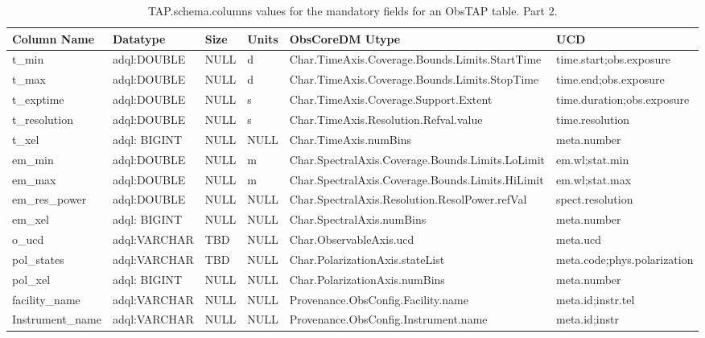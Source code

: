 \documentclass[11pt,a4paper]{ivoa}
\begin{document}
\begin{table}
\small
\begin{tabular}{|l|l|l|l|l|l|}%
\hline
Column Name & Datatype & Size & Units & ObsCoreDM Utype & UCD \\\hline
t\_min &
adql:DOUBLE &
NULL &
d &
Char.TimeAxis.Coverage.Bounds.Limits.StartTime &
time.start;obs.exposure \\\hline
t\_max &
adql:DOUBLE &
NULL &
d &
Char.TimeAxis.Coverage.Bounds.Limits.StopTime &
time.end;obs.exposure
\\\hline
t\_exptime &
adql:DOUBLE &
NULL &
s &
Char.TimeAxis.Coverage.Support.Extent &
time.duration;obs.exposure
\\\hline
t\_resolution &
adql:DOUBLE &
NULL &
s &
Char.TimeAxis.Resolution.Refval.value &
time.resolution
\\\hline
t\_xel &
adql: BIGINT &
NULL &
NULL &
Char.TimeAxis.numBins &
meta.number
\\\hline
em\_min &
adql:DOUBLE &
NULL &
m &
Char.SpectralAxis.Coverage.Bounds.Limits.LoLimit &
em.wl;stat.min
\\\hline
em\_max &
adql:DOUBLE &
NULL &
m &
Char.SpectralAxis.Coverage.Bounds.Limits.HiLimit &
em.wl;stat.max
\\\hline
em\_res\_power &
adql:DOUBLE &
NULL &
NULL &
Char.SpectralAxis.Resolution.ResolPower.refVal &
spect.resolution
\\\hline
em\_xel &
adql: BIGINT &
NULL &
NULL &
Char.SpectralAxis.numBins &
meta.number
\\\hline
o\_ucd &
adql:VARCHAR &
TBD &
NULL &
Char.ObservableAxis.ucd &
meta.ucd
\\\hline
pol\_states &
adql:VARCHAR &
TBD &
NULL &
Char.PolarizationAxis.stateList &
meta.code;phys.polarization
\\\hline
pol\_xel &
adql: BIGINT &
NULL &
NULL &
Char.PolarizationAxis.numBins &
meta.number
\\\hline
facility\_name &
adql:VARCHAR &
NULL &
NULL &
Provenance.ObsConfig.Facility.name &
meta.id;instr.tel
\\\hline
Instrument\_name &
adql:VARCHAR &
NULL  &
NULL &
Provenance.ObsConfig.Instrument.name &
meta.id;instr
\\\hline
\end{tabular}
\caption{TAP.schema.columns values for the mandatory fields for an ObsTAP table.  Part 2.}
\label{table:tapschema-mandatory2}
\end{table}
\end{document}
